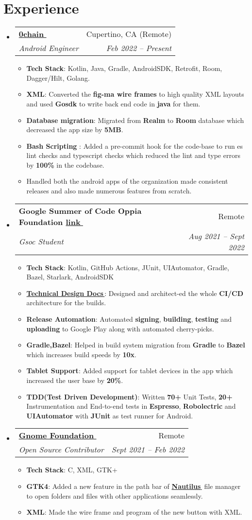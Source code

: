 \documentclass[letterpaper,11pt]{article}
\makeatletter
\let\orighref\href
\renewcommand{\href}[2]{\orighref{#1}{#2\,\faExternalLink}}
\newcommand{\resumeItem}[2]{
  \item\small{
    \textbf{#1}{: #2 \vspace{-2pt}}
  }
}
\newcommand{\resumeSubheading}[4]{
  \vspace{-1pt}\item
    \begin{tabular*}{0.97\textwidth}{l@{\extracolsep{\fill}}r}
      \textbf{#1} & #2 \\
      \textit{\small#3} & \textit{\small #4} \\
    \end{tabular*}\vspace{-5pt}
}
\newcommand{\resumeSubHeadingListStart}{\begin{itemize}[leftmargin=*]}
\newcommand{\resumeSubHeadingListEnd}{\end{itemize}}
\newcommand{\resumeItemListStart}{\begin{itemize}}
\newcommand{\resumeItemListEnd}{\end{itemize}\vspace{-5pt}}
\makeatother
\begin{document}
\section{Experience}
\resumeSubHeadingListStart
\resumeSubheading
{\href{https://0chain.net}{0chain}}{Cupertino, CA (Remote)}
{Android Engineer}{Feb 2022 -- Present}
\resumeItemListStart
\resumeItem{Tech Stack}{Kotlin, Java, Gradle, AndroidSDK, Retrofit, Room, Dagger/Hilt, Golang.}
\resumeItem{XML}
{Converted the \textbf{fig-ma wire frames} to high quality XML layouts and used \textbf{Gosdk} to write back end code in \textbf{java} for them.}
\resumeItem{Database migration}
{Migrated from \textbf{Realm} to \textbf{Room} database which decreased the app size by \textbf{5MB}.}
\resumeItem{Bash Scripting  }
{Added a pre-commit hook for the code-base to run es lint checks and typescript checks which reduced the lint and type errors by \textbf{100\%} in the codebase.}
\item {Handled both the android apps of the organization made consistent releases and also made numerous features from scratch.}
\resumeItemListEnd
\resumeSubheading
{Google Summer of Code Oppia Foundation \href{https://docs.google.com/document/d/150Yk14Cxmy8OAbSSwgP1aXDBLo1b8HtuIhmrRhzEWU4/edit}{link}}{Remote}
{Gsoc Student}{Aug 2021 -- Sept 2022}
\resumeItemListStart
\resumeItem{Tech Stack}{Kotlin, GitHub Actions, JUnit, UIAutomator, Gradle, Bazel, Starlark, AndroidSDK}
\resumeItem{\href{https://docs.google.com/document/d/150Yk14Cxmy8OAbSSwgP1aXDBLo1b8HtuIhmrRhzEWU4/edit}{Technical Design Docs}}{Designed and architect-ed the whole \textbf{CI/CD} architecture for the builds. }
\resumeItem{Release Automation}{Automated \textbf{signing}, \textbf{building}, \textbf{testing} and \textbf{uploading} to Google Play along with automated cherry-picks.}
\resumeItem{Gradle,Bazel}
{Helped in build system migration from \textbf{Gradle} to \textbf{Bazel} which increases build speeds by \textbf{10x}.}
\resumeItem{Tablet Support}
{ Added support for tablet devices in the app which increased the user base by \textbf{20\%}. }
\resumeItem{TDD(Test Driven Development)}
{Written \textbf{70+} Unit Tests, \textbf{20+} Instrumentation and End-to-end tests in \textbf{Espresso}, \textbf{Robolectric} and \textbf{UIAutomator} with \textbf{JUnit} as test runner for Android.}
\resumeItemListEnd
\resumeSubheading
{\href{https://gnome.org}{Gnome Foundation}}{Remote}
{Open Source Contributor}{Sept 2021 -- Feb 2022}
\resumeItemListStart
\resumeItem{Tech Stack}{C, XML, GTK+}
\resumeItem{GTK4}
{Added a new feature in the path bar of \href{https://gitlab.gnome.org/GNOME/nautilus}{\textbf{Nautilus}} file manager to open folders and files with other applications seamlessly.}
\resumeItem{XML}
{Made the wire frame and program of the new button with XML.}
\resumeItemListEnd
\resumeSubHeadingListEnd
\end{document}
